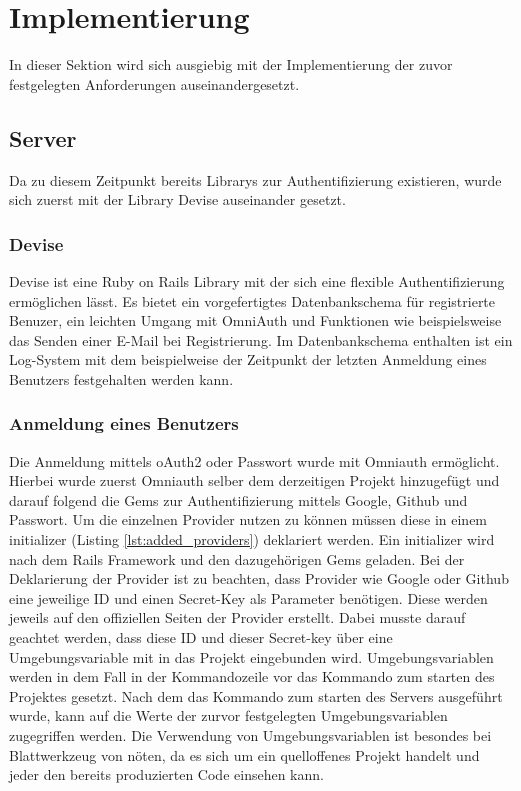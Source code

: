 \documentclass[paper=a4,fontsize=12pt,parskip=half]{scrartcl}
\begin{document}
	\section{Implementierung}
	\label{sec: implementation}
	In dieser Sektion wird sich ausgiebig mit der Implementierung der zuvor festgelegten Anforderungen auseinandergesetzt.
	
	\subsection{Server}
	\label{sec: server}
	Da zu diesem Zeitpunkt bereits Librarys zur Authentifizierung existieren, wurde sich zuerst mit der Library Devise auseinander gesetzt.
	
	\subsubsection{Devise}
	\label{sec: devise}
	Devise ist eine Ruby on Rails Library mit der sich eine flexible Authentifizierung ermöglichen lässt. Es bietet ein vorgefertigtes Datenbankschema für registrierte Benuzer, ein leichten Umgang mit OmniAuth und Funktionen wie beispielsweise das Senden einer E-Mail bei Registrierung. Im Datenbankschema enthalten ist ein Log-System mit dem beispielweise der Zeitpunkt der letzten Anmeldung eines Benutzers festgehalten werden kann. 
	
	\subsubsection{Anmeldung eines Benutzers}
	\label{sec: sign-in-imp}
	Die Anmeldung mittels oAuth2 oder Passwort wurde mit Omniauth ermöglicht. Hierbei wurde zuerst Omniauth selber dem derzeitigen Projekt hinzugefügt und darauf folgend die Gems zur Authentifizierung mittels Google, Github und Passwort. Um die einzelnen Provider nutzen zu können müssen diese in einem initializer (Listing \ref{lst:added_providers}) deklariert werden. Ein initializer wird nach dem Rails Framework und den dazugehörigen Gems geladen. Bei der Deklarierung der Provider ist zu beachten, dass Provider wie Google oder Github eine jeweilige ID und einen Secret-Key als Parameter benötigen. Diese werden jeweils auf den offiziellen Seiten der Provider erstellt. Dabei musste darauf geachtet werden, dass diese ID und dieser Secret-key über eine Umgebungsvariable mit in das Projekt eingebunden wird. Umgebungsvariablen werden in dem Fall in der Kommandozeile vor das Kommando zum starten des Projektes gesetzt. Nach dem das Kommando zum starten des Servers ausgeführt wurde, kann auf die Werte der zurvor festgelegten Umgebungsvariablen zugegriffen werden. Die Verwendung von Umgebungsvariablen ist besondes bei Blattwerkzeug von nöten, da es sich um ein quelloffenes Projekt handelt und jeder den bereits produzierten Code einsehen kann. 
	
\end{document}
